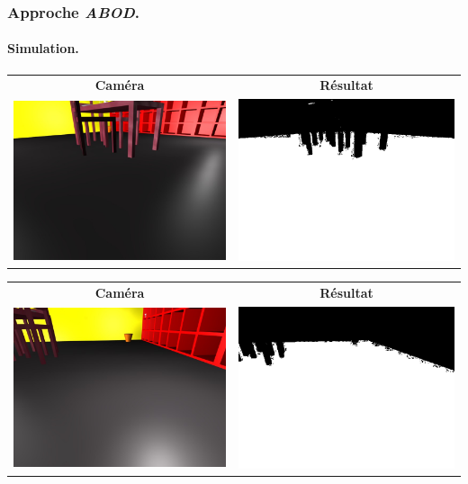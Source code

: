 \begin{frame}
    \frametitle{Approche \emph{ABOD}.}
    \framesubtitle{Simulation.}
    \begin{center}
         {
            \begin{tabular}{cc}
                \textbf{Caméra} & \textbf{Résultat} \\
                \includegraphics[width=0.4\linewidth]{rcs/abodv0s.png} & \includegraphics[width=0.4\linewidth]{rcs/abodv0r.png} \\
            \end{tabular}
        }  {
            \begin{tabular}{cc}
                \textbf{Caméra} & \textbf{Résultat} \\
                \includegraphics[width=0.4\linewidth]{rcs/abodv1s.png} & \includegraphics[width=0.4\linewidth]{rcs/abodv1r.png} \\

\end{tabular}}
\end{center}
\end{frame}
